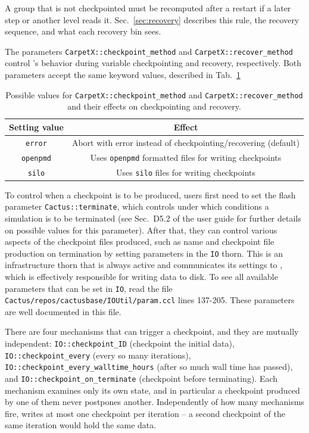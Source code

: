 A group that is not checkpointed must be recomputed after a restart if a later step or another level reads it. Sec.~\ref{sec:recovery} describes this rule, the recovery sequence, and what each recovery bin sees.

The parameters \texttt{CarpetX::checkpoint\_method} and \texttt{CarpetX::recover\_method} control \CarpetX's behavior during variable checkpointing and recovery, respectively. Both parameters accept the same keyword values, described in Tab.~\ref{tab:checkpoint_recovery}

\begin{table}[hb]
  \centering
  \begin{tabular}{cc}
  Setting value    & Effect                                                         \\ \hline\hline
  \texttt{error}   & Abort with error instead of checkpointing/recovering (default) \\
  \texttt{openpmd} & Uses \texttt{openpmd} formatted files for writing checkpoints  \\
  \texttt{silo}    & Uses \texttt{silo} files for writing checkpoints               \\ \hline\hline
  \end{tabular}
  \caption{Possible values for \texttt{CarpetX::checkpoint\_method} and \texttt{CarpetX::recover\_method} and their effects on checkpointing and recovery.}
  \label{tab:checkpoint_recovery}
\end{table}


To control when a checkpoint is to be produced, users first need to set the flash parameter \texttt{Cactus::terminate}, which controls under which conditions a simulation is to be terminated (see Sec.~D5.2 of the \Cactus\space user guide for further details on possible values for this parameter). After that, they can control various aspects of the checkpoint files produced, such as name and checkpoint file production on termination by setting parameters in the \texttt{IO} thorn. This is an infrastructure thorn that is always active and communicates its settings to \CarpetX, which is effectively responsible for writing data to disk. To see all available parameters that can be set in \texttt{IO}, read the file \texttt{Cactus/repos/cactusbase/IOUtil/param.ccl} lines 137-205. These parameters are well documented in this file. 

There are four mechanisms that can trigger a checkpoint, and they are mutually independent: \texttt{IO::checkpoint\_ID} (checkpoint the initial data), \texttt{IO::checkpoint\_every} (every so many iterations), \texttt{IO::checkpoint\_every\_walltime\_hours} (after so much wall time has passed), and \texttt{IO::checkpoint\_on\_terminate} (checkpoint before terminating). Each mechanism examines only its own state, and in particular a checkpoint produced by one of them never postpones another. Independently of how many mechanisms fire, \CarpetX{} writes at most one checkpoint per iteration -- a second checkpoint of the same iteration would hold the same data.

